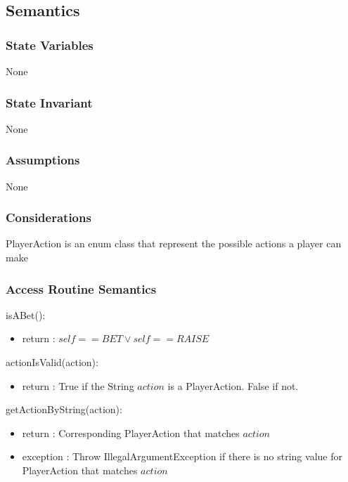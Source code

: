 \documentclass[12pt, titlepage]{article}
\begin{document}
    \subsection* {Semantics}
    
    \subsubsection* {State Variables}
        None
        
    \subsubsection* {State Invariant}
        None
    
    \subsubsection* {Assumptions}
        None
    
    \subsubsection* {Considerations}
        PlayerAction is an enum class that represent the possible actions a player can make
    
    \subsubsection* {Access Routine Semantics}
    
        \noindent isABet():
        \begin{itemize}
        \item return : $self == BET \vee self == RAISE$
        \end{itemize}
        
        \noindent actionIsValid(action):
        \begin{itemize}
        \item return : True if the String $action$ is a PlayerAction. False if not. 
        \end{itemize}
        
        \noindent getActionByString(action):
        \begin{itemize}
        \item return : Corresponding PlayerAction that matches $action$
        \item exception : Throw IllegalArgumentException if there is no  string value for PlayerAction that matches $action$
        \end{itemize}
         
\end{document}
